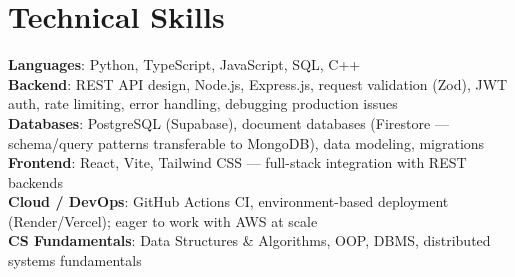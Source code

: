 \documentclass[letterpaper,11pt]{article}
\begin{document}
\section{Technical Skills}
  \begin{itemize}[leftmargin=0.15in, label={}]
    \small{\item{
      \textbf{Languages}{: Python, TypeScript, JavaScript, SQL, C++} \\
      \textbf{Backend}{: REST API design, Node.js, Express.js, request validation (Zod), JWT auth, rate limiting, error handling, debugging production issues} \\
      \textbf{Databases}{: PostgreSQL (Supabase), document databases (Firestore --- schema/query patterns transferable to MongoDB), data modeling, migrations} \\
      \textbf{Frontend}{: React, Vite, Tailwind CSS --- full-stack integration with REST backends} \\
      \textbf{Cloud / DevOps}{: GitHub Actions CI, environment-based deployment (Render/Vercel); eager to work with AWS at scale} \\
      \textbf{CS Fundamentals}{: Data Structures \& Algorithms, OOP, DBMS, distributed systems fundamentals}
    }}
  \end{itemize}
\end{document}

